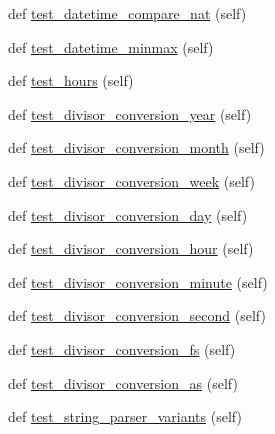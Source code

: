 \begin{DoxyCompactItemize}
\item 
def \hyperlink{classnumpy_1_1core_1_1tests_1_1test__datetime_1_1TestDateTime_a133d6369a954241423a83b263922c325}{test\+\_\+datetime\+\_\+compare\+\_\+nat} (self)
\item 
def \hyperlink{classnumpy_1_1core_1_1tests_1_1test__datetime_1_1TestDateTime_ae9044773ac3ec08016ba3bc077e48ff7}{test\+\_\+datetime\+\_\+minmax} (self)
\item 
def \hyperlink{classnumpy_1_1core_1_1tests_1_1test__datetime_1_1TestDateTime_a94642da1ea75068db86e4a47568651ce}{test\+\_\+hours} (self)
\item 
def \hyperlink{classnumpy_1_1core_1_1tests_1_1test__datetime_1_1TestDateTime_adce8f9123f389e1adda461c86292b574}{test\+\_\+divisor\+\_\+conversion\+\_\+year} (self)
\item 
def \hyperlink{classnumpy_1_1core_1_1tests_1_1test__datetime_1_1TestDateTime_a98e228b0e8acb4b846dd4114af170b6e}{test\+\_\+divisor\+\_\+conversion\+\_\+month} (self)
\item 
def \hyperlink{classnumpy_1_1core_1_1tests_1_1test__datetime_1_1TestDateTime_a099fb977042794712622ec44ca41678b}{test\+\_\+divisor\+\_\+conversion\+\_\+week} (self)
\item 
def \hyperlink{classnumpy_1_1core_1_1tests_1_1test__datetime_1_1TestDateTime_a878d062b0b18071095837217d76c73df}{test\+\_\+divisor\+\_\+conversion\+\_\+day} (self)
\item 
def \hyperlink{classnumpy_1_1core_1_1tests_1_1test__datetime_1_1TestDateTime_afc8b7bfe9fe9e9cebbcdf836fe1599a2}{test\+\_\+divisor\+\_\+conversion\+\_\+hour} (self)
\item 
def \hyperlink{classnumpy_1_1core_1_1tests_1_1test__datetime_1_1TestDateTime_a74386283690625ddda51d4dc6de6ccb7}{test\+\_\+divisor\+\_\+conversion\+\_\+minute} (self)
\item 
def \hyperlink{classnumpy_1_1core_1_1tests_1_1test__datetime_1_1TestDateTime_a230e52046ff5d1edc86c61b13d90943a}{test\+\_\+divisor\+\_\+conversion\+\_\+second} (self)
\item 
def \hyperlink{classnumpy_1_1core_1_1tests_1_1test__datetime_1_1TestDateTime_a202c8fdd0b8ab676fc34c76366f912fe}{test\+\_\+divisor\+\_\+conversion\+\_\+fs} (self)
\item 
def \hyperlink{classnumpy_1_1core_1_1tests_1_1test__datetime_1_1TestDateTime_a2a6738388741596938b3b07242d8126b}{test\+\_\+divisor\+\_\+conversion\+\_\+as} (self)
\item 
def \hyperlink{classnumpy_1_1core_1_1tests_1_1test__datetime_1_1TestDateTime_a3f928f7fc2b8412c065a52b383840304}{test\+\_\+string\+\_\+parser\+\_\+variants} (self)

\end{DoxyCompactItemize}
